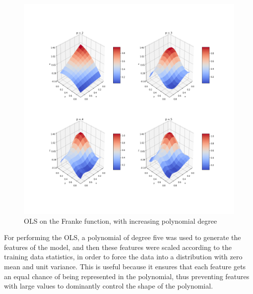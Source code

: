 \documentclass{article}
\begin{document}
\begin{figure}[h]
\includegraphics[scale=0.35]{frankePlots.png}
\caption{OLS on the Franke function, with increasing polynomial degree}
\end{figure}

For performing the OLS, a polynomial of degree five was used to generate the features of the model, and then these features were scaled according to the training data statistics, in order to force the data into a distribution with zero mean and unit variance. This is useful because it ensures that each feature gets an equal chance of being represented in the polynomial, thus preventing features with large values to dominantly control the shape of the polynomial.
\end{document}
